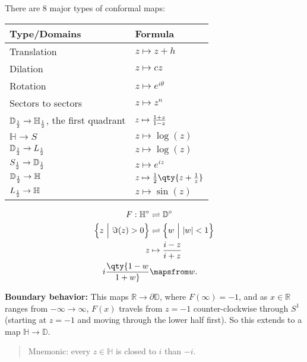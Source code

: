 \begin{theorem}

There are 8 major types of conformal maps:

\begin{longtable}[]{@{}
  >{\raggedright\arraybackslash}p{}
  >{\raggedright\arraybackslash}p{}@{}}
\toprule
Type/Domains & Formula \\
\midrule
\endhead
Translation & \(z\mapsto z + h\) \\
Dilation & \(z\mapsto cz\) \\
Rotation & \(z\mapsto e^{i\theta}\) \\
Sectors to sectors & \(z\mapsto z^n\) \\
\({\mathbb{D}}_{1\over 2} \to {\mathbb{H}}_{1\over 2}\), the first
quadrant & \(z\mapsto {1+z \over 1-z}\) \\
\({\mathbb{H}}\to S\) & \(z\mapsto \log(z)\) \\
\({\mathbb{D}}_{1\over 2} \to L_{1\over 2}\) & \(z\mapsto \log(z)\) \\
\(S_{1\over 2} \to {\mathbb{D}}_{1\over 2}\) & \(z\mapsto e^{iz}\) \\
\({\mathbb{D}}_{1\over 2} \to {\mathbb{H}}\) &
\(z\mapsto {1\over 2}\qty{z + {1\over z}}\) \\
\(L_{1\over 2} \to {\mathbb{H}}\) & \(z\mapsto \sin(z)\) \\
\bottomrule
\end{longtable}

\end{theorem}


\begin{proposition}

\begin{align*}
F: {\mathbb{H}}^\circ &\rightleftharpoons{\mathbb{D}}^\circ \\
\left\{{z{~\mathrel{\Big|}~}\Im(z) > 0 }\right\} &\rightleftharpoons\left\{{w{~\mathrel{\Big|}~}{\left\lvert {w} \right\rvert} < 1 }\right\} \\
z &\mapsto {i-z \over i+z} \\
i \qty{1-w \over 1+w} &\mapsfrom w
.\end{align*}

\textbf{Boundary behavior:} This maps
\({\mathbb{R}}\to {{\partial}}{\mathbb{D}}\), where \(F(\infty) = -1\),
and as \(x\in {\mathbb{R}}\) ranges from \(-\infty\to\infty\), \(F(x)\)
travels from \(z=-1\) counter-clockwise through \(S^1\) (starting at
\(z=-1\) and moving through the lower half first). So this extends to a
map \({\mathbb{H}}\to {\mathbb{D}}\).

\begin{quote}
Mnemonic: every \(z\in {\mathbb{H}}\) is closed to \(i\) than \(-i\).
\end{quote}

\end{proposition}

